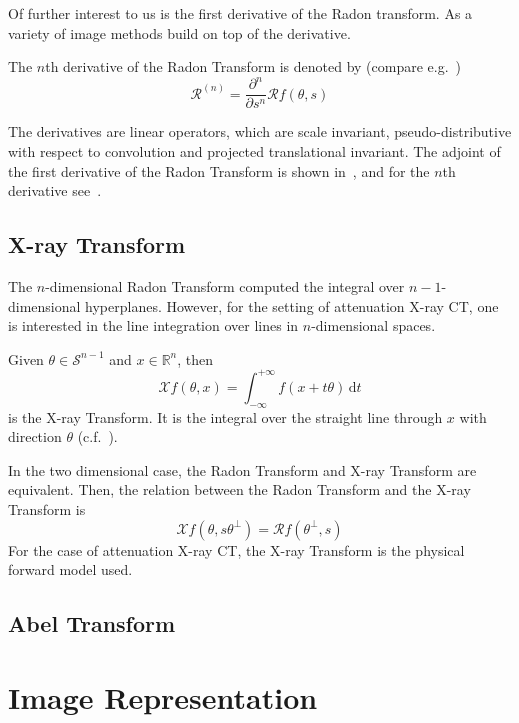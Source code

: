 Of further interest to us is the first derivative of the Radon transform. As a variety of image
methods build on top of the derivative.

\begin{definition}
	The \(n\)th derivative of the Radon Transform is denoted by (compare
	e.g.~\cite{nilchian_differential_2012,nilchian_fast_2013})
	\[ \mathscr{R}^{(n)} = \frac{\partial^n}{\partial s^n} \mathscr{R}f(\theta, s)\]
\end{definition}

The derivatives are linear operators, which are scale invariant, pseudo-distributive with respect to
convolution and projected translational invariant. The adjoint of the first derivative of the Radon
Transform is shown in~\cite{nilchian_differential_2012}, and for the \(n\)th derivative
see~\cite{nilchian_fast_2013}.

\section{X-ray Transform}\label{sec:xray_transform}

The \(n\)-dimensional Radon Transform computed the integral over \(n-1\)-dimensional hyperplanes.
However, for the setting of attenuation X-ray CT, one is interested in the line integration over
lines in \(n\)-dimensional spaces.

\begin{definition}
	Given \(\theta \in \mathscr{S}^{n-1}\) and \(x \in \mathbb{R}^n\), then
	\[ \mathscr{X}f(\theta, x) = \int_{-\infty}^{+\infty} f(x + t \theta) \, \mathrm{d}t\]
	is the X-ray Transform. It is the integral over the straight line through \(x\) with
	direction \(\theta\) (c.f.~\cite{natterer_mathematics_1986,solmon_x-ray_1976}).
\end{definition}

In the two dimensional case, the Radon Transform and X-ray Transform are equivalent.
Then, the relation between the Radon Transform and the X-ray Transform is
\[\mathscr{X}f(\theta, s\theta^\perp) = \mathscr{R}f(\theta^\perp, s)\]
For the case of attenuation X-ray CT, the X-ray Transform is the physical forward model used.

\section{Abel Transform}\label{sec:abel_transform}

\chapter{Image Representation}\label{chap:image_representation}

